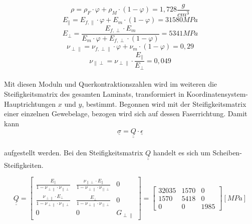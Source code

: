 \begin{equation}
	\rho=\rho_{F}\cdot\varphi +\rho_{M}\cdot (1-\varphi)=1,728\frac{g}{cm^{3}}
\end{equation}
\begin{equation}
	E_{\parallel}=E_{f,\parallel}\cdot \varphi+E_{m}\cdot (1-\varphi)=31580 MPa
\end{equation}
\begin{equation}
	E_{\perp}=\frac{E_{f,\perp}\cdot E_{m}}{E_{m}\cdot \varphi+E_{f,\perp}\cdot (1-\varphi)}=5341MPa
\end{equation}
\begin{equation}
	\nu_{\perp\parallel}=\nu_{f,\perp\parallel}\cdot\varphi+\nu_{m}\cdot(1-\varphi)=0,29
\end{equation}
\begin{equation}
	\nu_{\parallel\perp}=\nu_{\perp\parallel}\cdot\frac{E_{\parallel}}{E_{\perp}}=0,049
\end{equation}\\

\noindent Mit diesen Moduln und Querkontraktionszahlen wird im weiteren die Steifigkeitsmatrix des gesamten Laminats, transformiert in Koordinatensystem-Hauptrichtungen $x$ und $y$, bestimmt. Begonnen wird mit der Steifigkeitsmatrix einer einzelnen Gewebelage, bezogen wird sich auf dessen Faserrichtung. Damit kann  
\begin{equation}
	\underline{\sigma}=\underline{\underline{Q}} \cdot \underline{\epsilon}
\end{equation}\\aufgestellt werden. Bei den Steifigkeitsmatrix $\underline{\underline{Q}}$ handelt es sich um Scheiben-Steifigkeiten.

\begin{equation}
\underline{\underline{Q}}=
\begin{bmatrix}
	\frac{E_{\|}}{1-\nu_{\perp \|}\cdot \nu_{\| \perp}}&	\frac{\nu_{\| \perp}\cdot E_{\|}}{1-\nu_{\perp \|}\cdot \nu_{\| \perp}}&0\\
	
	\frac{\nu_{\perp \|}\cdot E_{\perp}}{1-\nu_{\perp \|}\cdot \nu_{\| \perp}}&\frac{E_{\perp}}{1-\nu_{\perp \|}\cdot \nu_{\| \perp}}&0\\
	
	0&0&G_{\perp\parallel}
\end{bmatrix} =
\begin{bmatrix}
	32035 & 1570 & 0\\
	1570 & 5418 & 0\\
	0 & 0 & 1985
\end{bmatrix} [MPa]
\end{equation}\\

